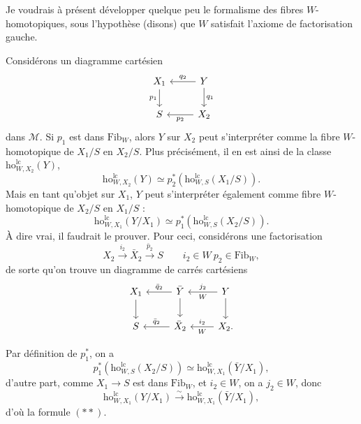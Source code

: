 \documentclass[11pt]{article}
\newcommand{\printedpage}[1]{\marginpar{\footnotesize p.~#1}}
\newcommand{\msp}[1]{\marginpar{\footnotesize [#1]}}
\newcommand{\ho}{\mathrm{ho}}
\newcommand{\lc}{\mathrm{lc}}
\begin{document}
\msp{page 241}
Je voudrais à présent développer quelque peu le formalisme des fibres $W$-homotopiques, sous l'hypothèse (disons) que $W$ satisfait l'axiome de factorisation gauche.

Considérons un diagramme cartésien
\[
\begin{tikzcd}
X_1 \arrow[d, "p_1"'] & Y \arrow[l, "q_2"'] \arrow[d, "q_1"] \\
S & X_2 \arrow[l, "p_2"]
\end{tikzcd}
\]
\printedpage{156}
dans $\mathcal{M}$. Si $p_1$ est dans $\mathrm{Fib}_W$, alors $Y$ sur $X_2$ peut s'interpréter comme la fibre $W$-homotopique de $X_1/S$ en $X_2/S$. Plus précisément, il en est ainsi de la classe $\ho^{\lc}_{W,X_2}(Y)$,
\[
\ho^{\lc}_{W,X_2}(Y) \simeq p_2^*(\ho^{\lc}_{W,S}(X_1/S)). \tag*{$(*)$}
\]
Mais en tant qu'objet sur $X_1$, $Y$ peut s'interpréter également comme fibre $W$-homotopique de $X_2/S$ en $X_1/S$ :
\[
\ho^{\lc}_{W,X_1}(Y/X_1) \simeq p_1^*(\ho^{\lc}_{W,S}(X_2/S)). \tag*{$(**)$}
\]
À dire vrai, il faudrait le prouver. Pour ceci, considérons une factorisation
\[
X_2 \xrightarrow{i_2} \bar{X}_2 \xrightarrow{\bar{p}_2} S \qquad i_2 \in W\ p_2 \in \mathrm{Fib}_W, %
\]
de sorte qu'on trouve un diagramme de carrés cartésiens
\[
\begin{tikzcd}
X_1 \arrow[d] & \bar{Y} \arrow[l, "\bar{q}_2"'] \arrow[d] & Y \arrow[l, "j_2"', "W"] \arrow[d] \\
S & \bar{X}_2 \arrow[l, "\bar{q}_2"'] & X_2. \arrow[l, "i_2"', "W"] %
\end{tikzcd}
\]

\msp{page 242}
Par définition de $p_1^*$, on a
\[
p_1^*(\ho^{\lc}_{W,S}(X_2/S)) \simeq \ho^{\lc}_{W,X_1}(\bar{Y}/X_1),
\]
d'autre part, comme $X_1 \longrightarrow S$ est dans $\mathrm{Fib}_W$, et $i_2 \in W$, on a $j_2 \in W$, donc
\[
\ho^{\lc}_{W,X_1}(Y/X_1) \xrightarrow{\sim} \ho^{\lc}_{W,X_1}(\bar{Y}/X_1),
\]
d'où la formule $(**)$.
\end{document}
